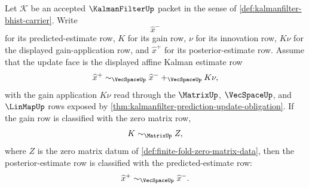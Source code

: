 \begin{theorem}
\label{thm:kalmanfilter-zero-gain-posterior-estimate-collapse}
Let $\mathcal K$ be an accepted $\KalmanFilterUp$ packet in the sense of \autoref{def:kalmanfilter-bhist-carrier}. Write
$$
\widehat{x}^{-}
$$
for its predicted-estimate row, $K$ for its gain row, $\nu$ for its innovation row, $K\nu$ for the displayed gain-application row, and $\widehat{x}^{+}$ for its posterior-estimate row. Assume that the update face is the displayed affine Kalman estimate row
$$
\widehat{x}^{+}\sim_{\VecSpaceUp}\widehat{x}^{-}+_{\VecSpaceUp}K\nu,
$$
with the gain application $K\nu$ read through the $\MatrixUp$, $\VecSpaceUp$, and $\LinMapUp$ rows exposed by \autoref{thm:kalmanfilter-prediction-update-obligation}. If the gain row is classified with the zero matrix row,
$$
K\sim_{\MatrixUp}Z,
$$
where $Z$ is the zero matrix datum of \autoref{def:finite-fold-zero-matrix-data}, then the posterior-estimate row is classified with the predicted-estimate row:
$$
\widehat{x}^{+}\sim_{\VecSpaceUp}\widehat{x}^{-}.
$$
\end{theorem}
